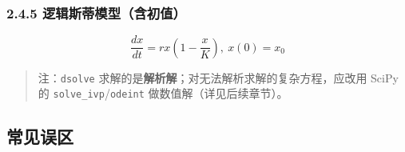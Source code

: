 \begin{Shaded}
\begin{Highlighting}[]
\end{Highlighting}
\end{Shaded}

\subsubsection{2.4.5
逻辑斯蒂模型（含初值）}\label{ux903bux8f91ux65afux8482ux6a21ux578bux542bux521dux503c}

\[\frac{dx}{dt}=r x\left(1-\frac{x}{K}\right),\ x(0)=x_0\]

\begin{Shaded}
\begin{Highlighting}[]
\OperatorTok{=}\OperatorTok{=}
\OperatorTok{=}\OperatorTok{=}\OperatorTok{=}\NormalTok{)}
\OperatorTok{=}\OperatorTok{*}\OperatorTok{*}\NormalTok{(} \OperatorTok{{-}}\OperatorTok{/}\OperatorTok{=}
\end{Highlighting}
\end{Shaded}

\begin{Shaded}
\begin{Highlighting}[]
\end{Highlighting}
\end{Shaded}

\begin{quote}
注：\texttt{dsolve}
求解的是\textbf{解析解}；对无法解析求解的复杂方程，应改用 SciPy 的
\texttt{solve\_ivp}/\texttt{odeint} 做数值解（详见后续章节）。
\end{quote}

\subsection{常见误区}\label{ux5e38ux89c1ux8befux533a-6}

